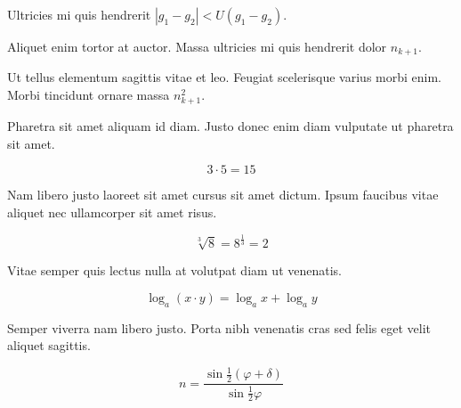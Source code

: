 \documentclass{article}
\begin{document}
Ultricies mi quis hendrerit \begin{math}
	|g_1-g_2|<U(g_1-g_2)
\end{math}.\newline

Aliquet enim tortor at auctor. Massa ultricies mi quis hendrerit dolor $ n_{k+1} $.\newline

Ut tellus elementum sagittis vitae et leo. Feugiat scelerisque varius morbi enim. Morbi tincidunt ornare massa \( n_{k+1}^2 \).\newline

Pharetra sit amet aliquam id diam. Justo donec enim diam vulputate ut pharetra sit amet.

\[ 3\cdot5=15 \]

Nam libero justo laoreet sit amet cursus sit amet dictum. Ipsum faucibus vitae aliquet nec ullamcorper sit amet risus.

$$ \sqrt[3]{8}=8^{\frac{1}{3}}=2 $$

Vitae semper quis lectus nulla at volutpat diam ut venenatis.

\begin{displaymath}
	\log _{a}(x\cdot y)=\log _{a}x+\log _{a}y
\end{displaymath}

Semper viverra nam libero justo. Porta nibh venenatis cras sed felis eget velit aliquet sagittis.

\begin{equation}
	n=\frac{\sin \frac{1}{2}(\varphi +\delta)}{\sin \frac{1}{2}\varphi}
\end{equation}
\end{document}
